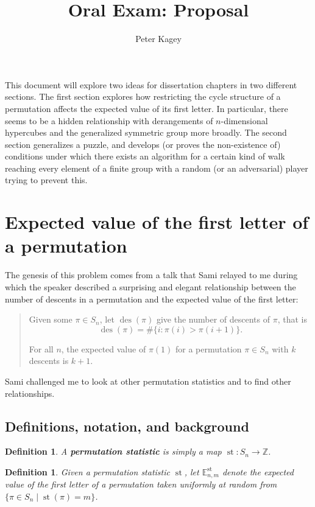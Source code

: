 \documentclass{article}
\numberwithin{equation}{subsection}
\newtheorem{definition}[theo]{Definition}
\begin{document}
\title{Oral Exam: Proposal}
\author{Peter Kagey}

\maketitle

This document will explore two ideas for dissertation chapters in two different
sections.
The first section explores how restricting the cycle structure of a permutation
affects the expected value of its first letter. In particular, there seems to
be a hidden relationship with derangements of $n$-dimensional hypercubes and
the generalized symmetric group more broadly.
The second section generalizes a puzzle, and develops (or proves the
non-existence of) conditions under which there exists an algorithm for
a certain kind of walk reaching every element of a finite group with a random
(or an adversarial) player trying to prevent this.

\tableofcontents

\section{Expected value of the first letter of a permutation}
The genesis of this problem comes from a talk that Sami relayed to me during
which the speaker described a surprising and elegant relationship between the
number of descents in a permutation and the expected value of the first letter:
\begin{quote}
Given some $\pi \in S_n$, let $\operatorname{des}(\pi)$ give the number of
descents of $\pi$, that is \begin{equation}
  {\operatorname{des}(\pi) = \#\{i : \pi(i) > \pi(i+1)\}}.
\end{equation}

For all $n$, the expected value of $\pi(1)$ for a permutation
$\pi \in S_n$ with $k$ descents is $k+ 1$.
\end{quote}
Sami challenged me to look at other permutation statistics and to find other
relationships.
\subsection{Definitions, notation, and background}
\begin{definition}
  A \textbf{permutation statistic} is simply a map $\operatorname{st} \colon S_n \rightarrow \mathbb Z$.
\end{definition}
\begin{definition}
  Given a permutation statistic $\operatorname{st}$, let
  $\mathbb{E}_{n,m}^\text{st}$ denote the expected value of the first letter
  of a permutation taken uniformly at random from
  $\{\pi \in S_n \mid \operatorname{st}(\pi) = m\}$.
\end{definition}
\end{document}
